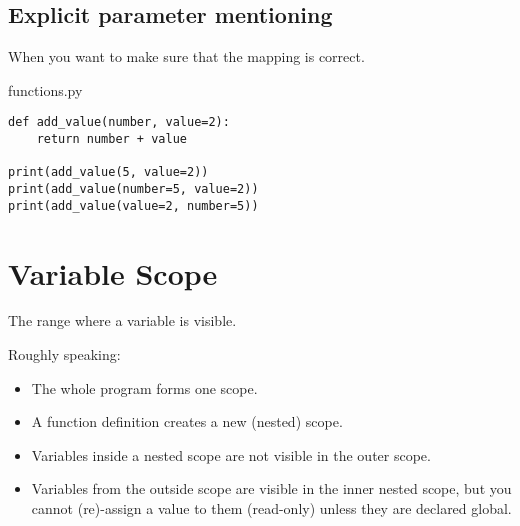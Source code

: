 \documentclass[aspectratio=1610,slidestop]{beamer}
\begin{document}
\subsection{Explicit parameter mentioning}
\begin{pframe}
 When you want to make sure that the mapping is correct.
 \medskip

 \begin{minipage}[t]{0.49\textwidth}
  \begin{pythonfile}{functions.py}
   \begin{verbatim}
def add_value(number, value=2):
    return number + value

print(add_value(5, value=2))
print(add_value(number=5, value=2))
print(add_value(value=2, number=5))
   \end{verbatim}
  \end{pythonfile}
 \end{minipage}\qquad
 \begin{minipage}[t]{0.47\textwidth}
  \vspace{-3.05cm}
  \begin{terminal}
  \end{terminal}
 \end{minipage}
\end{pframe}


\section{Variable Scope}

\begin{pframe}
 The range where a variable is visible.
 \bigskip

 Roughly speaking:
 \begin{itemize}
  \item The whole program forms one scope.
  \item A function definition creates a new (nested) scope.
  \item Variables inside a nested scope are not visible in the outer scope.
  \item Variables from the outside scope are visible in the inner nested scope,
        but you cannot (re)-assign a value to them (read-only) unless they are
       declared global.
 \end{itemize}
\end{pframe}
\end{document}
